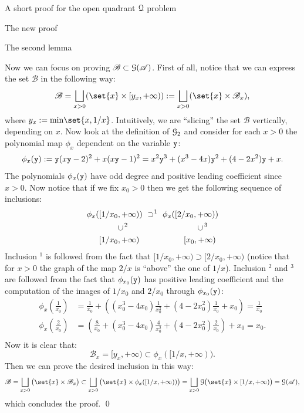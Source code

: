 \documentclass[11pt, a4paper, english, twoside, notitlepage, openright]{report}
\begin{document}
\begin{chapter}{A short proof for the open quadrant $\mathcal{Q}$ problem}
\begin{section}{The new proof}
\begin{subsection}{The second lemma}
\begin{lemma}
\begin{Proof}
Now we can focus on proving $\mathscr{B} \subset \mathcal{G}(\mathscr{A})$. First of all, notice that we can express the set $\mathscr{B}$ in the following way:
$$
\mathscr{B} = \bigsqcup_{x>0}(\set{x} \times [y_x, +\infty)) := \bigsqcup_{x>0}(\set{x} \times \mathscr{B}_x),
$$
where $y_x := \text{min}\set{x, 1/x}$. Intuitively, we are ``slicing'' the set $\mathscr{B}$ vertically, depending on $x$. Now look at the definition of $\mathcal{G}_2$ and consider for each $x > 0$ the polynomial map $\phi_x$ dependent on the variable ${\tt y}$:
$$
\phi_x({\tt y}) := {\tt y}(x{\tt y} - 2)^2 + x (x{\tt y} - 1)^2 = x^2{\tt y}^3 + (x^3 - 4x){\tt y}^2 + (4 - 2x^2){\tt y} + x.
$$
The polynomials $\phi_x({\tt y})$ have odd degree and positive leading coefficient since $x > 0$. Now notice that if we fix $x_0 > 0$ then we get the following sequence of inclusions:
\begin{equation*}
\begin{aligned}
\phi_x(&[1/x_0, +\infty))\ \supset ^1 \  \phi_x([2/x_0, +\infty))\\
&\quad \quad \ \rotatebox[origin=c]{90}{$\subset$}\, ^2  \hspace{3cm} \rotatebox[origin=c]{90}{$\subset$}\, ^3\\
&[1/x_0, +\infty) \hspace{1.9cm} [x_0, +\infty) \\
\end{aligned}
\end{equation*}
Inclusion $^1$ is followed from the fact that $[1/x_0, +\infty) \supset [2/x_0, +\infty)$ (notice that for $x>0$ the graph of the map $2/x$ is ``above'' the one of $1/x$). Inclusion $^2$ and $^3$ are followed from the fact that $\phi_{x_0}({\tt y})$ has positive leading coefficient and the computation of the images of $1/x_0$ and $2/x_0$ through $\phi_{x_0}({\tt y})$:
\begin{equation*}
\begin{aligned}
\phi_x\left(\frac{1}{x_0}\right)& = \frac{1}{x_0} + \left((x_0^3 - 4x_0)\frac{1}{x_0^2} + (4 - 2x_0^2)\frac{1}{x_0} + x_0\right) = \frac{1}{x_0}\\
\phi_x\left(\frac{2}{x_0}\right)& = \left(\frac{8}{x_0} + (x_0^3 - 4x_0)\frac{4}{x_0^2} + (4 - 2x_0^2)\frac{2}{x_0}\right) + x_0 = x_0.\\
\end{aligned}
\end{equation*}
Now it is clear that:
$$
\mathscr{B}_x = [y_x, +\infty) \subset \phi_x([1/x, +\infty)).
$$
Then we can prove the desired inclusion in this way:
$$
\mathscr{B} = \bigsqcup_{x>0}\big(\set{x} \times \mathscr{B}_x\big) \subset \bigsqcup_{x>0}\big(\set{x} \times \phi_x([1/x, +\infty))\big) = \bigsqcup_{x>0}\GG\big(\set{x} \times [1/x, +\infty)\big) = \GG(\mathscr{A}),
$$
which concludes the proof.
\qed
\end{Proof}
\end{lemma}
\end{subsection}


\end{section}
\end{chapter}
\end{document}
